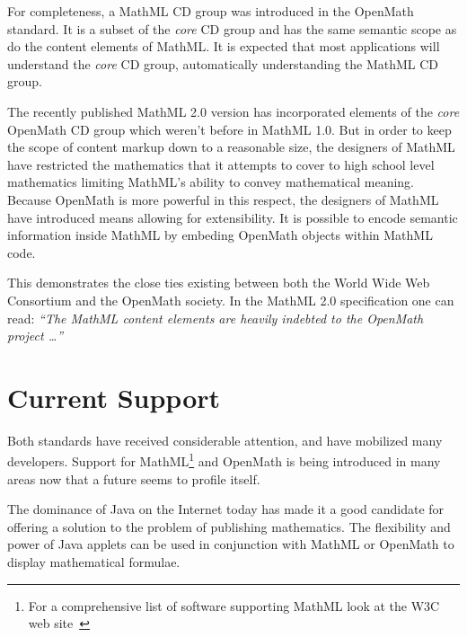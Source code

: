For completeness, a MathML CD group was introduced in the OpenMath standard. It is a subset
of the {\it core} CD group and has the same semantic scope as do the content elements of MathML. It is
expected that most applications will understand the {\it core} CD group, automatically understanding the
MathML CD group.

The recently published MathML 2.0 version has incorporated elements of the {\it core}
OpenMath CD group which weren't before in MathML 1.0. But in order to keep the
scope of content markup down to a reasonable size, the designers of MathML have
restricted the mathematics that it attempts to cover to high school level mathematics limiting MathML's
ability to convey mathematical meaning. Because OpenMath is more powerful in this respect, the designers
of MathML have introduced means allowing for extensibility. It is possible to encode semantic information
inside MathML by embeding OpenMath objects within MathML code.

This demonstrates the close ties existing between both the World Wide Web Consortium and
the OpenMath society. In the MathML 2.0 specification one can read: {\it
``The MathML content elements are heavily indebted to the OpenMath project \ldots''}

\section{Current Support}
   
Both standards have received considerable attention, and have mobilized many developers. Support for MathML\footnote{For a comprehensive list of software supporting MathML look at the W3C web site~\cite{w3c}}
and OpenMath is being introduced in many areas now that a future seems to profile itself. 

The dominance of Java on the Internet today has made it a good candidate for offering a solution to the
problem of publishing mathematics. The flexibility and power of Java applets can be used in conjunction with
MathML or OpenMath to display mathematical formulae.

